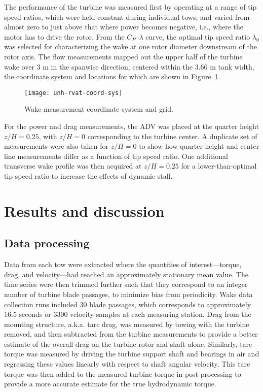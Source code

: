The performance of the turbine was measured first by operating at a range of tip
speed ratios, which were held constant during individual tows, and varied from
almost zero to just above that where power becomes negative, i.e., where the
motor has to drive the rotor. From the $C_P$--$\lambda$ curve, the optimal tip
speed ratio $\lambda_0$ was selected for characterizing the wake at one rotor
diameter downstream of the rotor axis. The flow measurements mapped out the
upper half of the turbine wake over 3 m in the spanwise direction, centered
within the 3.66 m tank width, the coordinate system and locations for which are
shown in Figure~\ref{fig:RVAT-baseline-wake-coordinates}.

\begin{figure}
    \centering
    
    \texttt{[image: unh-rvat-coord-sys]}
    
    \caption{Wake measurement coordinate system and grid.}
    
    \label{fig:RVAT-baseline-wake-coordinates}
\end{figure}

For the power and drag measurements, the ADV was placed at the quarter height
$z/H = 0.25$, with $z/H=0$ corresponding to the turbine center. A duplicate set
of measurements were also taken for $z/H = 0$ to show how quarter height and
center line measurements differ as a function of tip speed ratio. One additional
transverse wake profile was then acquired at $z/H = 0.25$ for a
lower-than-optimal tip speed ratio to increase the effects of dynamic stall.


\section{Results and discussion}

\subsection{Data processing}

Data from each tow were extracted where the quantities of interest---torque,
drag, and velocity---had reached an approximately stationary mean value. The
time series were then trimmed further such that they correspond to an integer
number of turbine blade passages, to minimize bias from periodicity. Wake data
collection runs included 30 blade passages, which corresponds to approximately
16.5 seconds or 3300 velocity samples at each measuring station. Drag from the
mounting structure, a.k.a. tare drag, was measured by towing with the turbine
removed, and then subtracted from the turbine measurements to provide a better
estimate of the overall drag on the turbine rotor and shaft alone. Similarly,
tare torque was measured by driving the turbine support shaft and bearings in
air and regressing these values linearly with respect to shaft angular velocity.
This tare torque was then added to the measured turbine torque in
post-processing to provide a more accurate estimate for the true hydrodynamic
torque.

